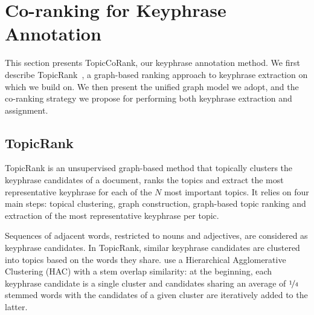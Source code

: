 \section{Co-ranking for Keyphrase Annotation}
\label{sec:topicrankpp}

  This section presents TopicCoRank, our keyphrase annotation method.
  We first describe TopicRank~\cite{bougouin2013topicrank}, a 
  graph-based ranking approach to keyphrase extraction on which we build on.
  We then present the unified graph model we adopt, and the co-ranking
  strategy we propose for performing both keyphrase extraction and assignment.

  
  
  
  \subsection{TopicRank}
  \label{subsec:topicrank}
    TopicRank is an unsupervised graph-based method that topically clusters the
    keyphrase candidates of a document, ranks the topics and extract the
    most representative keyphrase for each of the $N$ most important topics. It
    relies on four main steps: topical clustering, graph construction,
    graph-based topic ranking and extraction of the most representative keyphrase
    per topic.
    
    Sequences of adjacent words, restricted to nouns and adjectives, are 
    considered as keyphrase candidates.
    In TopicRank, similar keyphrase candidates are clustered into topics based
    on the words they share.
     use a Hierarchical
    Agglomerative Clustering (HAC) with a stem overlap similarity: at
    the beginning, each keyphrase candidate is a single cluster and candidates
    sharing an average of $\unitfrac{1}{4}$ stemmed words with the candidates of
    a given cluster are iteratively added to the latter.
    
